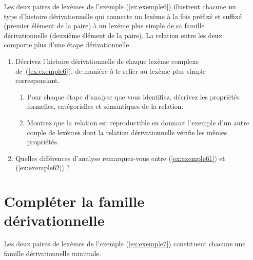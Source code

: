 Les deux paires de lexèmes de l'exemple (\ref{ex:exemple6})  illustrent chacune un type d'histoire dérivationnelle qui connecte un lexème à la fois préfixé et suffixé  (premier élément de la paire) à un lexème plus simple de sa famille dérivationnelle  (deuxième élément de la paire). La relation entre les deux comporte plus d'une étape dérivationnelle. 

\begin{exe}
  \ex \label{ex:exemple6}
  \begin{xlist}
    \ex \label{ex:exemple61} \exsixantigrippal
    \ex \label{ex:exemple62} \exsixpostglaciaire
  \end{xlist}
\end{exe}

\begin{enumerate}
\item Décrivez l'histoire dérivationnelle de chaque lexème complexe de~(\ref{ex:exemple6}), de manière à le relier au lexème plus simple correspondant.  
  \begin{enumerate}
  \item Pour chaque étape d'analyse que vous identifiez, décrivez les propriétés formelles, catégorislles et sémantiques de la relation.
  \item Montrez que la relation est reproductible en donnant l'exemple d'un autre couple de lexèmes dont la relation dérivationnelle vérifie les mêmes propriétés.
  \end{enumerate}
\item Quelles différences d'analyse remarquez-vous entre (\ref{ex:exemple61}) et (\ref{ex:exemple62}) ?
\end{enumerate}

\section{Compléter la famille dérivationnelle}

Les deux paires de lexèmes de l'exemple (\ref{ex:exemple7})  constituent chacune une famille dérivationnelle minimale. 

\begin{exe}
  \ex \label{ex:exemple7}
  \begin{xlist}
    \ex \label{ex:exemple71} \exseptapplicateur
    \ex \label{ex:exemple72} \exseptcontestataire
  \end{xlist}
\end{exe}

